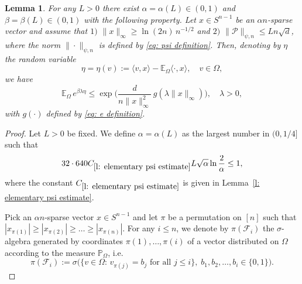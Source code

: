 \documentclass[12pt]{article}
\newtheorem{lemma}[theorem]{Lemma}
\theoremstyle{definition}
\theoremstyle{plain}
\newcommand{\E}{\mathbb{E}}
\def\Prob{{\mathbb P}}
\def\pvector{{\mathcal P}}
\def\gfunction{{g}}
\begin{document}
\begin{lemma}\label{l: big linfty norm}
For any $L>0$ there exist $\alpha=\alpha(L)\in(0,1)$ and $\beta=\beta(L)\in(0,1)$ with the following property. 
Let $x\in S^{n-1}$ be an $\alpha n$-sparse vector and assume that
$1)$ $\|x\|_\infty \geq \ln(2n)\, n^{-1/2}$ and $2)$
$\|\pvector\|_{\psi,n}\leq L n\sqrt{d}$, where the norm $\|\cdot\|_{\psi,n}$ is defined by \eqref{eq: psi definition}.
Then, denoting by $\eta$ the random variable
$$\eta=\eta(v):=\langle v,x\rangle - \E_\Omega \langle \cdot,x\rangle,\quad v\in\Omega,$$
we have
$$\E_\Omega\, e^{\beta \lambda \eta}
\leq \exp\bigg(\frac{d}{n\|x\|_\infty^2}\,\gfunction(\lambda \|x\|_\infty)\bigg),\quad \lambda>0,$$
with $\gfunction(\cdot)$ defined by \eqref{eq: e definition}.
\end{lemma}
\begin{proof}
Let $L>0$ be fixed.
We define $\alpha=\alpha(L)$ as the largest number in $(0,1/4]$ such that
\begin{equation}\label{eq: alpha condition}
32\cdot 640C_{\ref{l: elementary psi estimate}} L\sqrt{\alpha}\ln\frac{2}{\alpha}\leq 1,
\end{equation}
where the constant $C_{\ref{l: elementary psi estimate}}$ is given in Lemma~\ref{l: elementary psi estimate}.

Pick an $\alpha n$-sparse vector $x\in S^{n-1}$
and let $\pi$ be a permutation on $[n]$ such that $|x_{\pi(1)}|\geq |x_{\pi(2)}|\geq\ldots\geq |x_{\pi(n)}|$.
For any $i\leq n$, we denote by $\pi(\mathcal F_i)$ the $\sigma$-algebra generated by
coordinates $\pi(1),\ldots,\pi(i)$ of a vector distributed on $\Omega$ according to the measure $\Prob_\Omega$, i.e.\
$$\pi(\mathcal F_i):=\sigma\big(\bigl\{v\in\Omega:\,v_{\pi(j)}=b_j\mbox{ for all }j\leq i\bigr\},\;b_1,b_2,\ldots,b_i\in\{0,1\}\big).$$


\end{proof}
\end{document}
